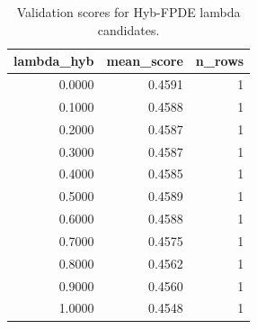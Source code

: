 \begin{table}[t]
\caption{Validation scores for Hyb-FPDE lambda candidates.}
\label{tab:lambda_distribution_computed}
\centering
\begin{tabular}{rrr}
\toprule
lambda\_hyb & mean\_score & n\_rows \\
\midrule
0.0000 & 0.4591 & 1 \\
0.1000 & 0.4588 & 1 \\
0.2000 & 0.4587 & 1 \\
0.3000 & 0.4587 & 1 \\
0.4000 & 0.4585 & 1 \\
0.5000 & 0.4589 & 1 \\
0.6000 & 0.4588 & 1 \\
0.7000 & 0.4575 & 1 \\
0.8000 & 0.4562 & 1 \\
0.9000 & 0.4560 & 1 \\
1.0000 & 0.4548 & 1 \\
\bottomrule
\end{tabular}

\end{table}
